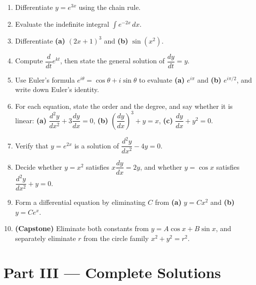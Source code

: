 \begin{enumerate}[leftmargin=2em]
    \item Differentiate $y = e^{3x}$ using the chain rule.

    \item Evaluate the indefinite integral $\displaystyle\int e^{-2x}\,dx$.

    \item Differentiate \textbf{(a)} $(2x+1)^{3}$ and \textbf{(b)} $\sin(x^{2})$.

    \item Compute $\dfrac{d}{dt}e^{kt}$, then state the general solution of
          $\dfrac{dy}{dt} = y$.

    \item Use Euler's formula $e^{i\theta} = \cos\theta + i\sin\theta$ to
          evaluate \textbf{(a)} $e^{i\pi}$ and \textbf{(b)} $e^{i\pi/2}$, and
          write down Euler's identity.

    \item For each equation, state the order and the degree, and say whether it
          is linear:
          \textbf{(a)} $\dfrac{d^{2}y}{dx^{2}} + 3\dfrac{dy}{dx} = 0$, \quad
          \textbf{(b)} $\left(\dfrac{dy}{dx}\right)^{3} + y = x$, \quad
          \textbf{(c)} $\dfrac{dy}{dx} + y^{2} = 0$.

    \item Verify that $y = e^{2x}$ is a solution of $\dfrac{d^{2}y}{dx^{2}} - 4y = 0$.

    \item Decide whether $y = x^{2}$ satisfies $x\dfrac{dy}{dx} = 2y$, and
          whether $y = \cos x$ satisfies $\dfrac{d^{2}y}{dx^{2}} + y = 0$.

    \item Form a differential equation by eliminating $C$ from \textbf{(a)}
          $y = Cx^{2}$ and \textbf{(b)} $y = Ce^{x}$.

    \item \textbf{(Capstone)} Eliminate both constants from
          $y = A\cos x + B\sin x$, and separately eliminate $r$ from the circle
          family $x^{2} + y^{2} = r^{2}$.
\end{enumerate}

\clearpage
{}
{}
\section*{Part III --- Complete Solutions}

